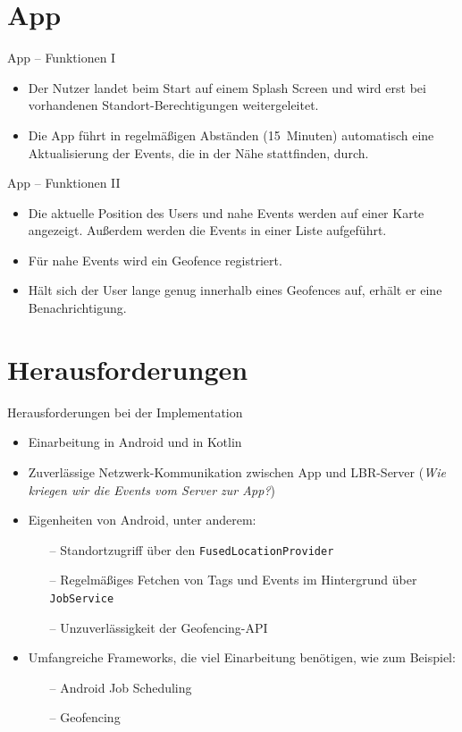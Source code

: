 \documentclass{beamer}
\begin{document}
	
	\section{App}
	\begin{frame}{App -- Funktionen I}
		\begin{itemize}
			\item Der Nutzer landet beim Start auf einem \alert{Splash Screen} und wird erst bei vorhandenen Standort-Berechtigungen weitergeleitet.
			\item Die App führt in regelmäßigen Abständen (15~Minuten) automatisch eine \alert{Aktualisierung} der Events, die in der Nähe stattfinden, durch. 
		\end{itemize}
	\end{frame}

	\begin{frame}{App -- Funktionen II}
		\begin{itemize}
			\item Die aktuelle Position des Users und nahe Events werden auf einer \alert{Karte} angezeigt. Außerdem werden die Events in einer Liste aufgeführt.
			\item Für nahe Events wird ein \alert{Geofence} registriert.
			\item Hält sich der User lange genug innerhalb eines Geofences auf, erhält er eine \alert{Benachrichtigung}.
		\end{itemize}
	\end{frame}

	\section{Herausforderungen}
	\begin{frame}{Herausforderungen bei der Implementation}
		\begin{itemize}
			\item \alert<1>{Einarbeitung} in Android und in Kotlin
			\item Zuverlässige \alert<2>{Netzwerk-Kommunikation} zwischen App und LBR-Server (\textit{Wie kriegen wir die Events vom Server zur App?})
			\item \alert<3>{Eigenheiten} von Android, unter anderem:
				\begin{itemize}
					\item[--] Standortzugriff über den \texttt{FusedLocationProvider}
					\item[--] Regelmäßiges Fetchen von Tags und Events im Hintergrund über \texttt{JobService}
					\item[--] Unzuverlässigkeit der Geofencing-API
				\end{itemize}
			\item Umfangreiche \alert<4>{Frameworks}, die viel Einarbeitung benötigen, wie zum Beispiel:
				\begin{itemize}
					\item[--] Android Job Scheduling
					\item[--] Geofencing
				\end{itemize}
		\end{itemize}
	\end{frame}
\end{document}
